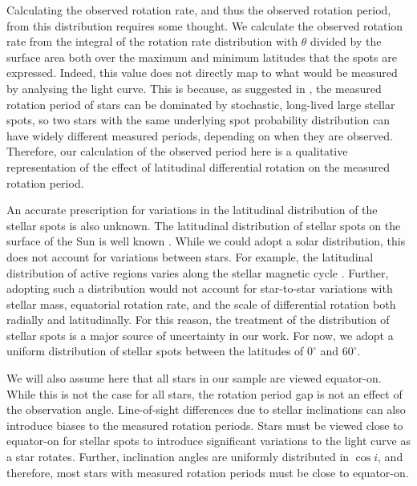 Calculating the observed rotation rate, and thus the observed rotation period, from this distribution requires some thought.
We calculate the observed rotation rate from the integral of the rotation rate distribution with $\theta$ divided by the surface area both over the maximum and minimum latitudes that the spots are expressed.
Indeed, this value does not directly map to what would be measured by analysing the light curve. 
This is because, as suggested in \citet{aigrain_hare_2015}, the measured rotation period of stars can be dominated by stochastic, long-lived large stellar spots, so two stars with the same underlying spot probability distribution can have widely different measured periods, depending on when they are observed.
Therefore, our calculation of the observed period here is a qualitative representation of the effect of latitudinal differential rotation on the measured rotation period.

An accurate prescription for variations in the latitudinal distribution of the stellar spots is also unknown.
The latitudinal distribution of stellar spots on the surface of the Sun is well known \citep[see, e.g.,][]{maunder_note_1904,hathaway_solar_2015}.
While we could adopt a solar distribution, this does not account for variations between stars.
For example, the latitudinal distribution of active regions varies along the stellar magnetic cycle \citep[see, e.g.,][ and references therein]{grijs_stellar_2021}.
Further, adopting such a distribution would not account for star-to-star variations with stellar mass, equatorial rotation rate, and the scale of differential rotation both radially and latitudinally.
For this reason, the treatment of the distribution of stellar spots is a major source of uncertainty in our work.
For now, we adopt a uniform distribution of stellar spots between the latitudes of $0^{\circ}$ and $60^{\circ}$.

We will also assume here that all stars in our sample are viewed equator-on.
While this is not the case for all stars, the rotation period gap is not an effect of the observation angle.
Line-of-sight differences due to stellar inclinations can also introduce biases to the measured rotation periods.
Stars must be viewed close to equator-on for stellar spots to introduce significant variations to the light curve as a star rotates.
Further, inclination angles are uniformly distributed in $\cos{i}$, and therefore, most stars with measured rotation periods must be close to equator-on.

